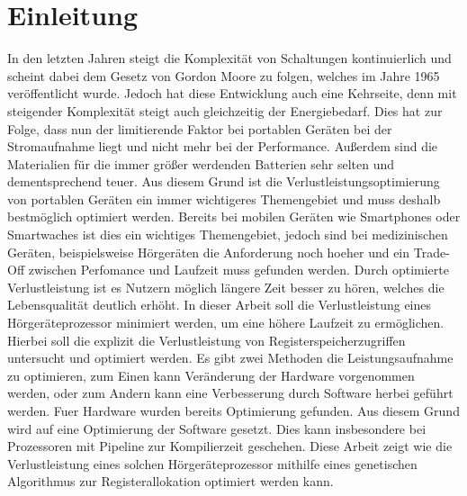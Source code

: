 
\thispagestyle{empty}
%
\chapter{Einleitung}
\label{chap:introduction}
In den letzten Jahren steigt die Komplexität von Schaltungen kontinuierlich und scheint dabei dem Gesetz von Gordon Moore zu folgen, welches im Jahre 1965 veröffentlicht wurde. Jedoch hat diese Entwicklung auch eine Kehrseite, denn mit steigender Komplexität steigt auch gleichzeitig der Energiebedarf. Dies hat zur Folge, dass nun der limitierende Faktor bei portablen Geräten bei der Stromaufnahme liegt und nicht mehr bei der Performance. Außerdem sind die Materialien für die immer größer werdenden Batterien sehr selten und dementsprechend teuer. Aus diesem Grund ist die Verlustleistungsoptimierung von portablen Geräten ein immer wichtigeres Themengebiet und muss deshalb bestmöglich optimiert werden. Bereits bei mobilen Geräten wie Smartphones oder Smartwaches ist dies ein wichtiges Themengebiet, jedoch sind bei medizinischen Geräten, beispielsweise Hörgeräten die Anforderung noch hoeher und ein Trade-Off zwischen Perfomance und Laufzeit muss gefunden werden. Durch optimierte Verlustleistung ist es Nutzern möglich längere Zeit besser zu hören, welches die Lebensqualität deutlich erhöht.
In dieser Arbeit soll die Verlustleistung eines Hörgeräteprozessor minimiert werden, um eine höhere Laufzeit zu ermöglichen. Hierbei soll die explizit die Verlustleistung von Registerspeicherzugriffen untersucht und optimiert werden. 
Es gibt zwei Methoden die Leistungsaufnahme zu optimieren, zum Einen kann Veränderung der Hardware vorgenommen werden, oder zum Andern kann eine Verbesserung durch Software herbei geführt werden. Fuer Hardware wurden bereits Optimierung gefunden. Aus diesem Grund wird auf eine Optimierung der Software gesetzt. Dies kann insbesondere bei Prozessoren mit Pipeline zur Kompilierzeit geschehen. 
Diese Arbeit zeigt wie die Verlustleistung eines solchen Hörgeräteprozessor mithilfe eines genetischen Algorithmus zur Registerallokation optimiert werden kann.


